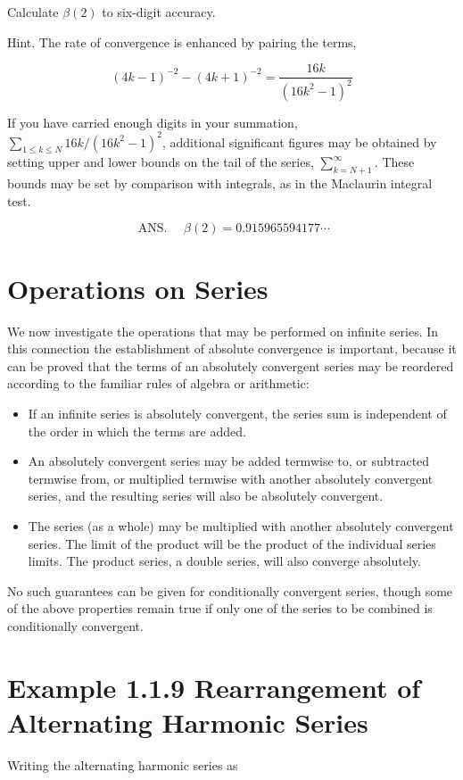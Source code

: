 \documentclass[10pt]{article}
\begin{document}
Calculate $\beta(2)$ to six-digit accuracy.

Hint. The rate of convergence is enhanced by pairing the terms,

$$
(4 k-1)^{-2}-(4 k+1)^{-2}=\frac{16 k}{\left(16 k^{2}-1\right)^{2}}
$$

If you have carried enough digits in your summation, $\sum_{1 \leq k \leq N} 16 k /\left(16 k^{2}-1\right)^{2}$, additional significant figures may be obtained by setting upper and lower bounds on the tail of the series, $\sum_{k=N+1}^{\infty}$. These bounds may be set by comparison with integrals, as in the Maclaurin integral test.

$$
\text { ANS. } \quad \beta(2)=0.915965594177 \cdots
$$

\section*{Operations on Series}
We now investigate the operations that may be performed on infinite series. In this connection the establishment of absolute convergence is important, because it can be proved that the terms of an absolutely convergent series may be reordered according to the familiar rules of algebra or arithmetic:

\begin{itemize}
  \item If an infinite series is absolutely convergent, the series sum is independent of the order in which the terms are added.
  \item An absolutely convergent series may be added termwise to, or subtracted termwise from, or multiplied termwise with another absolutely convergent series, and the resulting series will also be absolutely convergent.
  \item The series (as a whole) may be multiplied with another absolutely convergent series. The limit of the product will be the product of the individual series limits. The product series, a double series, will also converge absolutely.
\end{itemize}

No such guarantees can be given for conditionally convergent series, though some of the above properties remain true if only one of the series to be combined is conditionally convergent.

\section*{Example 1.1.9 Rearrangement of Alternating Harmonic Series}
Writing the alternating harmonic series as
\end{document}
